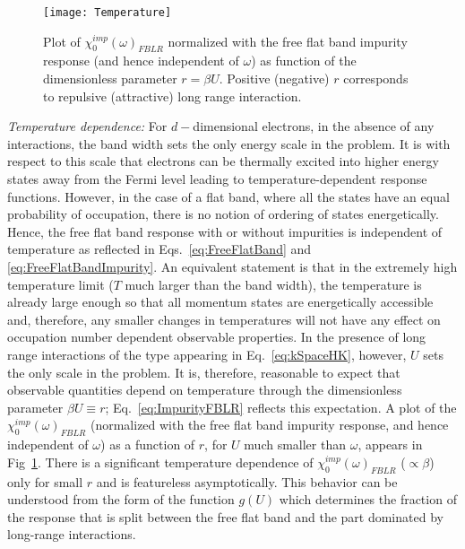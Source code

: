 \documentclass[prl,aps,twocolumn,groupaddress]{revtex4-1}
\begin{document}
\begin{figure}[h!]
\texttt{[image: Temperature]}
\caption{Plot of $\chi_0^{imp}(\omega)_{FBLR}$ normalized with the free flat band impurity response (and hence independent of $\omega$) as  function of the dimensionless parameter $r= \beta U$. Positive (negative) $r$ corresponds to repulsive (attractive) long range interaction.  }\label{Temperature}
\end{figure}
\textit{Temperature dependence:} For $d-$dimensional electrons, in the absence of any interactions, the band width sets the only energy scale in the problem. It is with respect to this scale that electrons can be thermally excited into higher energy states away from the Fermi level leading to temperature-dependent response functions. However, in the case of a flat band, where all the states have an equal probability of occupation, there is no notion of ordering of states energetically. Hence, the free flat band response with or without impurities is independent of temperature as reflected in Eqs.~\ref{eq:FreeFlatBand} and \ref{eq:FreeFlatBandImpurity}.  An equivalent statement is that in the extremely high temperature limit ($T$ much larger than the band width), the temperature is already large enough so that all momentum states are energetically accessible and, therefore, any smaller changes in temperatures will not have any effect on occupation number dependent observable properties. In the presence of long range interactions of the type appearing in Eq.~\ref{eq:kSpaceHK}, however, $U$ sets the only scale in the problem. It is, therefore, reasonable to expect that observable quantities depend on temperature through the dimensionless parameter $\beta U \equiv r$; Eq.~\ref{eq:ImpurityFBLR} reflects this expectation. A plot of the $\chi_0^{imp}(\omega)_{FBLR}$ (normalized with the free flat band impurity response, and hence independent of $\omega$) as a function of $r$, for $U$ much smaller than $\omega$, appears in Fig~\ref{Temperature}. There is a significant temperature dependence of $\chi_0^{imp}(\omega)_{FBLR}$ ($\propto \beta$) only for small $r$ and is featureless asymptotically. This behavior can be understood from the form of the function $g(U)$ which determines the fraction of the response  that is split between the free flat band and the part dominated by long-range interactions. \\ \newline
\end{document}
